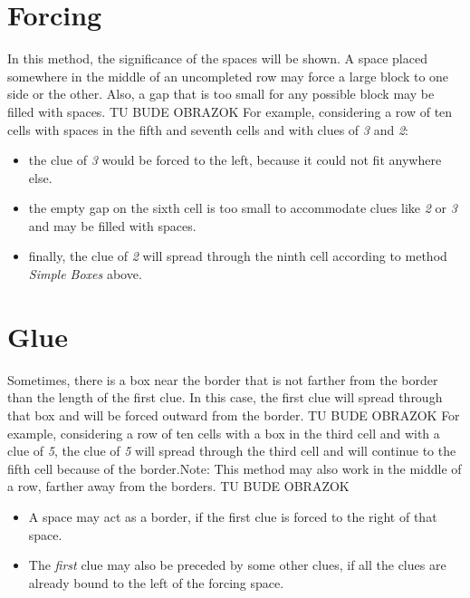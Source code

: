 {{\section{Forcing}
In this method, the significance of the spaces will be shown. A space placed somewhere in the middle of an uncompleted row may force a large block to one side or the other. Also, a gap that is too small for any possible block may be filled with spaces.
TU BUDE OBRAZOK
For example, considering a row of ten cells with spaces in the fifth and seventh cells and with clues of \textit{3} and \textit{2}:
\begin{itemize} \item {the clue of \textit{3} would be forced to the left, because it could not fit anywhere else.}\item {the empty gap on the sixth cell is too small to accommodate clues like \textit{2} or \textit{3} and may be filled with spaces.}\item {finally, the clue of \textit{2} will spread through the ninth cell according to method \textit{Simple Boxes} above.} \end{itemize}

\section{Glue}
Sometimes, there is a box near the border that is not farther from the border than the length of the first clue. In this case, the first clue will spread through that box and will be forced outward from the border.
TU BUDE OBRAZOK
For example, considering a row of ten cells with a box in the third cell and with a clue of \textit{5}, the clue of \textit{5} will spread through the third cell and will continue to the fifth cell because of the border.Note: This method may also work in the middle of a row, farther away from the borders.
TU BUDE OBRAZOK

\begin{itemize} \item {A space may act as a border, if the first clue is forced to the right of that space.}\item {The \textit{first} clue may also be preceded by some other clues, if all the clues are already bound to the left of the forcing space.} \end{itemize}

}}

